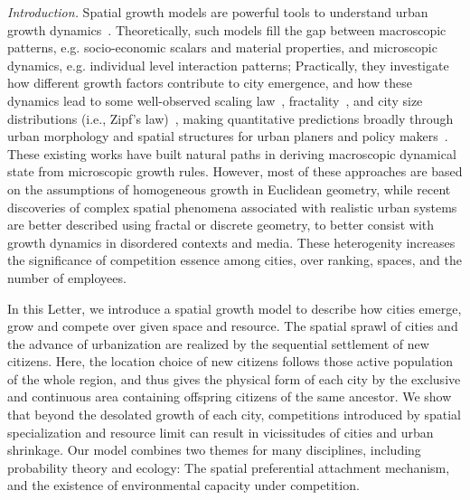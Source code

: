 \documentclass[reprint,unsortedaddress,amsmath,amssymb,aps,prl,showkeys]{revtex4-2}
\begin{document}
\textit{Introduction.} Spatial growth models are powerful tools to understand urban growth dynamics~\cite{PhysRevX.4.011008, Li2017Simple, makse1995modelling, rybski2013distance, nanda2017spatial}. Theoretically, such models fill the gap between macroscopic patterns, e.g. socio-economic scalars and material properties, and microscopic dynamics, e.g. individual level interaction patterns; Practically, they investigate how different growth factors contribute to city emergence, and how these dynamics lead to some well-observed scaling law~\cite{bettencourt2007growth,court2013origins,batty2008size,batty2019urbanscalinglaw}, fractality~\cite{batty1994fractal,batty2007cities}, and city size distributions (i.e., Zipf's law)~\cite{zipf1949human}, making quantitative predictions broadly through urban morphology and spatial structures for urban planers and policy makers~\cite{anas1998urban}. These existing works have built natural paths in deriving macroscopic dynamical state from microscopic growth rules. However, most of these approaches are based on the assumptions of homogeneous growth in Euclidean geometry, while recent discoveries of complex spatial phenomena associated with realistic urban systems are better described using fractal or discrete geometry, to better consist with growth dynamics in disordered contexts and media. These heterogenity increases the significance of competition essence among cities, over ranking, spaces, and the number of employees. 

In this Letter, we introduce a spatial growth model to describe how cities emerge, grow and compete over given space and resource. The spatial sprawl of cities and the advance of urbanization are realized by the sequential settlement of new citizens. Here, the location choice of new citizens follows those active population of the whole region, and thus gives the physical form of each city by the exclusive and continuous area containing offspring citizens of the same ancestor. We show that beyond the desolated growth of each city, competitions introduced by spatial specialization and resource limit can result in vicissitudes of cities and urban shrinkage. Our model combines two themes for many disciplines, including probability theory and ecology: The spatial preferential attachment mechanism, and the existence of environmental capacity under competition. 
\end{document}
